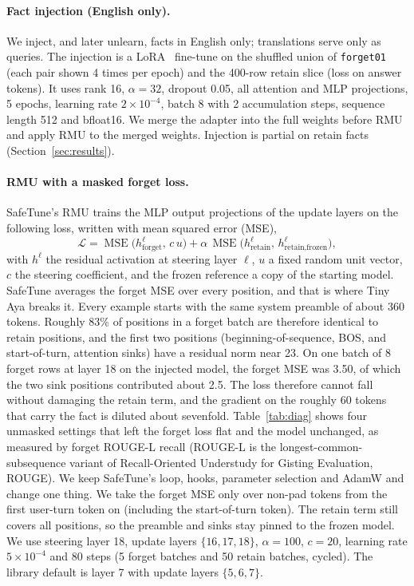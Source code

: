 \documentclass[10pt,twocolumn]{article}
\newcommand{\code}[1]{\texttt{#1}}
\begin{document}
\paragraph{Fact injection (English only).} We inject, and later unlearn, facts in English only; translations serve only as queries. The injection is a LoRA~\cite{hu2021lora} fine-tune on the shuffled union of \code{forget01} (each pair shown 4 times per epoch) and the 400-row retain slice (loss on answer tokens). It uses rank 16, $\alpha=32$, dropout 0.05, all attention and MLP projections, 5 epochs, learning rate $2\times10^{-4}$, batch 8 with 2 accumulation steps, sequence length 512 and bfloat16. We merge the adapter into the full weights before RMU and apply RMU to the merged weights. Injection is partial on retain facts (Section~\ref{sec:results}).

\paragraph{RMU with a masked forget loss.}\label{sec:mask} SafeTune's RMU trains the MLP output projections of the update layers on the following loss, written with mean squared error (MSE),
\begin{equation}
\mathcal{L}=\operatorname{MSE}\!\big(h^{\ell}_{\text{forget}},\,c\,u\big)+\alpha\,\operatorname{MSE}\!\big(h^{\ell}_{\text{retain}},\,h^{\ell}_{\text{retain,frozen}}\big),
\end{equation}
with $h^{\ell}$ the residual activation at steering layer $\ell$, $u$ a fixed random unit vector, $c$ the steering coefficient, and the frozen reference a copy of the starting model. SafeTune averages the forget MSE over every position, and that is where Tiny Aya breaks it. Every example starts with the same system preamble of about 360 tokens. Roughly 83\% of positions in a forget batch are therefore identical to retain positions, and the first two positions (beginning-of-sequence, BOS, and start-of-turn, attention sinks) have a residual norm near 23. On one batch of 8 forget rows at layer 18 on the injected model, the forget MSE was 3.50, of which the two sink positions contributed about 2.5. The loss therefore cannot fall without damaging the retain term, and the gradient on the roughly 60 tokens that carry the fact is diluted about sevenfold. Table~\ref{tab:diag} shows four unmasked settings that left the forget loss flat and the model unchanged, as measured by forget ROUGE-L recall (ROUGE-L is the longest-common-subsequence variant of Recall-Oriented Understudy for Gisting Evaluation, ROUGE). We keep SafeTune's loop, hooks, parameter selection and AdamW and change one thing. We take the forget MSE only over non-pad tokens from the first user-turn token on (including the start-of-turn token). The retain term still covers all positions, so the preamble and sinks stay pinned to the frozen model. We use steering layer 18, update layers $\{16,17,18\}$, $\alpha=100$, $c=20$, learning rate $5\times10^{-4}$ and 80 steps (5 forget batches and 50 retain batches, cycled). The library default is layer 7 with update layers $\{5,6,7\}$.
\end{document}
